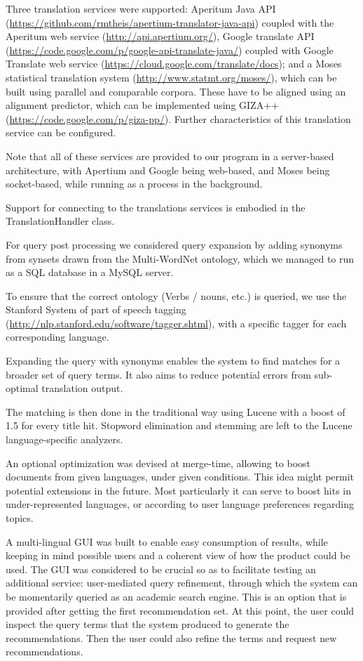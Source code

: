\documentclass{llncs}
\begin{document}
Three translation services were supported: Aperitum Java API (\url{https://github.com/rmtheis/apertium-translator-java-api}) coupled with the Aperitum web service (\url{http://api.apertium.org/}), Google translate API (\url{https://code.google.com/p/google-api-translate-java/}) coupled with Google Translate web service (\url{https://cloud.google.com/translate/docs}); and a Moses statistical translation system (\url{http://www.statmt.org/moses/})\cite{koehn2007moses}, which can be built using parallel and comparable corpora. These have to be aligned using an alignment predictor, which can be implemented using GIZA++ (\url{https://code.google.com/p/giza-pp/}). Further characteristics of this translation service can be configured. 

Note that all of these services are provided to our program in a server-based architecture, with Apertium and Google being web-based, and Moses being socket-based, while running as a process in the background.

Support for connecting to the translations services is embodied in the TranslationHandler class. 

For query post processing we considered query expansion by adding synonyms from synsets drawn from the Multi-WordNet ontology\cite{pianta2002developing}, which we managed to run as a SQL database in a MySQL server. 

To ensure that the correct ontology (Verbs / nouns, etc.) is queried, we use the Stanford System of part of speech tagging (\url{http://nlp.stanford.edu/software/tagger.shtml}), with a specific tagger for each corresponding language. 

Expanding the query with synonyms enables the system to find matches for a broader set of query terms. It also aims to reduce potential errors from sub-optimal translation output. 

The matching is then done in the traditional way using Lucene with a boost of 1.5 for every title hit. Stopword elimination and stemming are left to the Lucene language-specific analyzers. 

An optional optimization was devised at merge-time, allowing to boost documents from given languages, under given conditions. This idea might permit potential extensions in the future. Most particularly it can serve to boost hits in under-represented languages, or according to user language preferences regarding topics.

A multi-lingual GUI was built to enable easy consumption of results, while keeping in mind possible users and a coherent view of how the product could be used. The GUI was considered to be crucial so as to facilitate testing an additional service: user-mediated query refinement, through which the system can be momentarily queried as an academic search engine. This is an option that is provided after getting the first recommendation set. At this point, the user could inspect the query terms that the system produced to generate the recommendations. Then the user could also refine the terms and request new recommendations.
\end{document}
